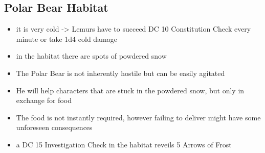 \subsection*{ Polar Bear Habitat}
\begin{itemize}
	\item it is very cold -> Lemurs have to succeed DC 10 Constitution Check every minute or take 1d4 cold damage
	\item in the habitat there are spots of powdered snow
	\item The Polar Bear is not inherently hostile but can be easily agitated
	\item He will help characters that are stuck in the powdered snow, but only in exchange for food
	\item The food is not instantly required, however failing to deliver might have some unforeseen consequences
	\item a DC 15 Investigation Check in the habitat reveils 5 Arrows of Frost
\end{itemize}
